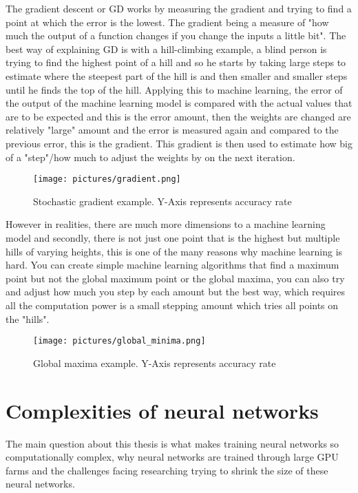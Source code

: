 \documentclass[a4paper,oneside,phd,etd]{BYUPhys}
\begin{document}
The gradient descent or GD works by measuring the gradient and trying to find a point at which the error is the lowest. The gradient being a measure of "how much the output of a function changes if you change the inputs a little bit"\cite{towards-data-science}.
The best way of explaining GD is with a hill-climbing example, a blind person is trying to find the highest point of a hill and so he starts by taking large steps to estimate where the steepest part of the hill is and then smaller and smaller steps until he finds the top of the hill. Applying this to machine learning, the error of the output of the machine learning model is compared with the actual values that are to be expected and this is the error amount, then the weights are changed are relatively "large" amount and the error is measured again and compared to the previous error, this is the gradient. This gradient is then used to estimate how big of a "step"/how much to adjust the weights by on the next iteration.
\begin{figure}[H]
\centering
\texttt{[image: pictures/gradient.png]}
\caption{Stochastic gradient example.
Y-Axis represents accuracy rate}
\label{fig:gradient}
\end{figure}

However in realities, there are much more dimensions to a machine learning model and secondly, there is not just one point that is the highest but multiple hills of varying heights, this is one of the many reasons why machine learning is hard. You can create simple machine learning algorithms that find a maximum point but not the global maximum point or the global maxima, you can also try and adjust how much you step by each amount but the best way, which requires all the computation power is a small stepping amount which tries all points on the "hills". 
\begin{figure}[H]
\centering
\texttt{[image: pictures/global\_minima.png]}
\caption{Global maxima example.
Y-Axis represents accuracy rate}
\label{fig:global_minima}
\end{figure}

\section{Complexities of neural networks}
The main question about this thesis is what makes training neural networks so computationally complex, why neural networks are trained through large GPU farms and the challenges facing researching trying to shrink the size of these neural networks.
\end{document}
